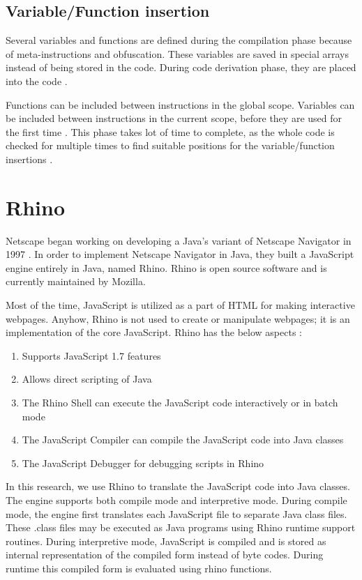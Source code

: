 \subsection{Variable/Function insertion}

Several variables and functions are defined during the compilation phase because of meta-instructions and obfuscation. These variables are saved in special arrays instead of being stored in the code. During code derivation phase, they are placed into the code .

Functions can be included between instructions in the global scope. Variables can be included between instructions in the current scope, before they are used for the first time \cite{bib4}. This phase takes lot of time to complete, as the whole code is checked for multiple times to find suitable positions for the variable/function insertions \cite{bib26}.


\section{Rhino}

Netscape began working on developing a Java’s variant of Netscape Navigator in 1997 \cite{bib27}. In order to implement Netscape Navigator in Java, they built a JavaScript engine entirely in Java, named Rhino. Rhino is open source software and is currently maintained by Mozilla.

Most of the time, JavaScript is utilized as a part of HTML for making interactive webpages. Anyhow, Rhino is not used to create or manipulate webpages; it is an implementation of the core JavaScript. Rhino has the below aspects \cite{bib27}:

\begin{enumerate}
\item Supports JavaScript 1.7 features
\item Allows direct scripting of Java
\item The Rhino Shell can execute the JavaScript code interactively or in batch mode
\item The JavaScript Compiler can compile the JavaScript code into Java classes
\item The JavaScript Debugger for debugging scripts in Rhino
\end{enumerate}
 
In this research, we use Rhino to translate the JavaScript code into Java classes. The engine supports both compile mode and interpretive mode. During compile mode, the engine first translates each JavaScript file to separate Java class files. These .class files may be executed as Java programs using Rhino runtime support routines. During interpretive mode, JavaScript is compiled and is stored as internal representation of the compiled form instead of byte codes. During runtime this compiled form is evaluated using rhino functions.

